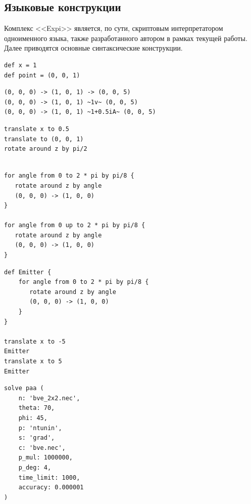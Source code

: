 \subsection*{Языковые конструкции}
Комплекс <<Expi>> является, по сути, скриптовым интерпретатором одноименного языка, также разработанного автором в рамках текущей работы. Далее приводятся основные синтаксические конструкции.

\begin{lstlisting}[caption={Переменные}, label={experiment}]
def x = 1
def point = (0, 0, 1)
\end{lstlisting}

\begin{lstlisting}[caption={Сегментированный провод}, label={experiment}]
(0, 0, 0) -> (1, 0, 1) -> (0, 0, 5)
(0, 0, 0) -> (1, 0, 1) ~1v~ (0, 0, 5)
(0, 0, 0) -> (1, 0, 1) ~1+0.5iA~ (0, 0, 5)
\end{lstlisting}

\begin{lstlisting}[caption={Линейные преобразования}, label={experiment}]
translate x to 0.5
translate to (0, 0, 1)
rotate around z by pi/2
\end{lstlisting}

\begin{lstlisting}[caption={Циклы}, label={experiment}]

for angle from 0 to 2 * pi by pi/8 {
   rotate around z by angle
   (0, 0, 0) -> (1, 0, 0)
}

for angle from 0 up to 2 * pi by pi/8 {
   rotate around z by angle
   (0, 0, 0) -> (1, 0, 0)
}

\end{lstlisting}


\begin{lstlisting}[caption={Группы команд}, label={experiment}]
def Emitter {
    for angle from 0 to 2 * pi by pi/8 {
       rotate around z by angle
       (0, 0, 0) -> (1, 0, 0)
    }
}

translate x to -5
Emitter
translate x to 5
Emitter
\end{lstlisting}

\begin{lstlisting}[caption={Оптимизация направленности ФАР}, label={experiment}]
solve paa (
    n: 'bve_2x2.nec',
    theta: 70,
    phi: 45,
    p: 'ntunin',
    s: 'grad',
    c: 'bve.nec',
    p_mul: 1000000,
    p_deg: 4,
    time_limit: 1000,
    accuracy: 0.000001
)
\end{lstlisting}



